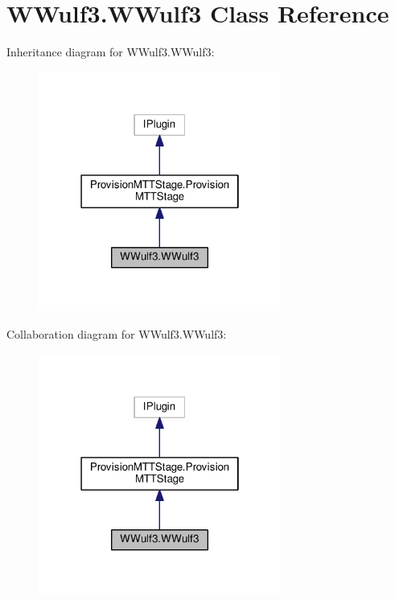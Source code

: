 \hypertarget{class_w_wulf3_1_1_w_wulf3}{\section{W\-Wulf3.\-W\-Wulf3 Class Reference}
\label{class_w_wulf3_1_1_w_wulf3}
}


Inheritance diagram for W\-Wulf3.\-W\-Wulf3\-:
\nopagebreak
\begin{figure}[H]
\begin{center}
\leavevmode
\includegraphics[width=226pt]{class_w_wulf3_1_1_w_wulf3__inherit__graph}
\end{center}
\end{figure}


Collaboration diagram for W\-Wulf3.\-W\-Wulf3\-:
\nopagebreak
\begin{figure}[H]
\begin{center}
\leavevmode
\includegraphics[width=226pt]{class_w_wulf3_1_1_w_wulf3__coll__graph}
\end{center}
\end{figure}
